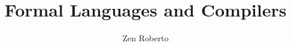 \documentclass[a4paper]{report}
\title{Formal Languages and Compilers}
\author{Zen Roberto}
\begin{document}




\tableofcontents







\listofalgorithms
\end{document}
